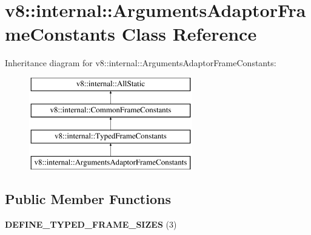 \hypertarget{classv8_1_1internal_1_1ArgumentsAdaptorFrameConstants}{}\section{v8\+:\+:internal\+:\+:Arguments\+Adaptor\+Frame\+Constants Class Reference}
\label{classv8_1_1internal_1_1ArgumentsAdaptorFrameConstants}
Inheritance diagram for v8\+:\+:internal\+:\+:Arguments\+Adaptor\+Frame\+Constants\+:\begin{figure}[H]
\begin{center}
\leavevmode
\includegraphics[height=4.000000cm]{classv8_1_1internal_1_1ArgumentsAdaptorFrameConstants}
\end{center}
\end{figure}
\subsection*{Public Member Functions}
\begin{DoxyCompactItemize}
\item 
\mbox{\label{classv8_1_1internal_1_1ArgumentsAdaptorFrameConstants_ad690c1d380dc2dafc37997f8871f97da}} 
{\bfseries D\+E\+F\+I\+N\+E\+\_\+\+T\+Y\+P\+E\+D\+\_\+\+F\+R\+A\+M\+E\+\_\+\+S\+I\+Z\+ES} (3)
\end{DoxyCompactItemize}

